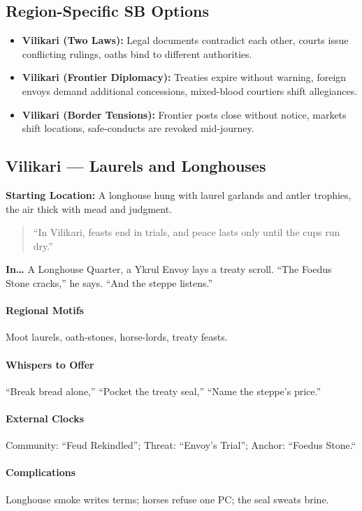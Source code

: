 \subsection*{Region-Specific SB Options}
\begin{itemize}
\item \textbf{Vilikari (Two Laws):} Legal documents contradict each other, courts issue conflicting rulings, oaths bind to different authorities.
\item \textbf{Vilikari (Frontier Diplomacy):} Treaties expire without warning, foreign envoys demand additional concessions, mixed-blood courtiers shift allegiances.
\item \textbf{Vilikari (Border Tensions):} Frontier posts close without notice, markets shift locations, safe-conducts are revoked mid-journey.
\end{itemize}


\subsection*{Vilikari — Laurels and Longhouses}
\textbf{Starting Location:} A longhouse hung with laurel garlands and antler trophies, the air thick with mead and judgment.
\begin{quote}
“In Vilikari, feasts end in trials, and peace lasts only until the cups run dry.”
\end{quote}

\textbf{In…} A Longhouse Quarter, a Ykrul Envoy lays a treaty scroll. ``The Foedus Stone cracks,'' he says. ``And the steppe listens.''
\paragraph{Regional Motifs} Moot laurels, oath-stones, horse-lords, treaty feasts.
\paragraph{Whispers to Offer} ``Break bread alone,'' ``Pocket the treaty seal,'' ``Name the steppe’s price.''
\paragraph{External Clocks} Community: ``Feud Rekindled''; Threat: ``Envoy’s Trial''; Anchor: ``Foedus Stone.``
\paragraph{Complications} Longhouse smoke writes terms; horses refuse one PC; the seal sweats brine.
